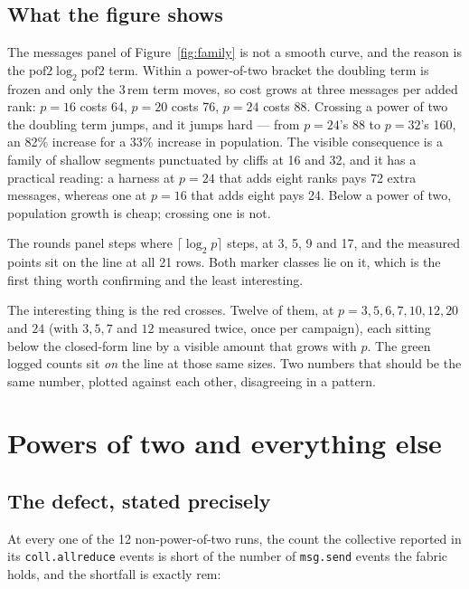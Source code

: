 \documentclass[11pt]{article}
\begin{document}
\subsection{What the figure shows}

The messages panel of Figure~\ref{fig:family} is not a smooth curve, and the reason is the
$\mathrm{pof2}\log_2\mathrm{pof2}$ term. Within a power-of-two bracket the doubling term is
frozen and only the $3\,\mathrm{rem}$ term moves, so cost grows at three messages per added rank:
$p=16$ costs 64, $p=20$ costs 76, $p=24$ costs 88. Crossing a power of two the doubling term
jumps, and it jumps hard --- from $p=24$'s 88 to $p=32$'s 160, an 82\% increase for a 33\%
increase in population. The visible consequence is a family of shallow segments punctuated by
cliffs at 16 and 32, and it has a practical reading: a harness at $p=24$ that adds eight ranks
pays 72 extra messages, whereas one at $p=16$ that adds eight pays 24. Below a power of two,
population growth is cheap; crossing one is not.

The rounds panel steps where $\lceil\log_2 p\rceil$ steps, at 3, 5, 9 and 17, and the measured
points sit on the line at all 21 rows. Both marker classes lie on it, which is the first thing
worth confirming and the least interesting.

The interesting thing is the red crosses. Twelve of them, at $p = 3, 5, 6, 7, 10, 12, 20$ and
$24$ (with $3, 5, 7$ and $12$ measured twice, once per campaign), each sitting below the
closed-form line by a visible amount that grows with $p$. The green logged counts sit
\emph{on} the line at those same sizes. Two numbers that should be the same number, plotted
against each other, disagreeing in a pattern.

\section{Powers of two and everything else}

\subsection{The defect, stated precisely}

At every one of the 12 non-power-of-two runs, the count the collective reported in its
\texttt{coll.allreduce} events is short of the number of \texttt{msg.send} events the fabric
holds, and the shortfall is exactly $\mathrm{rem}$:
\end{document}
